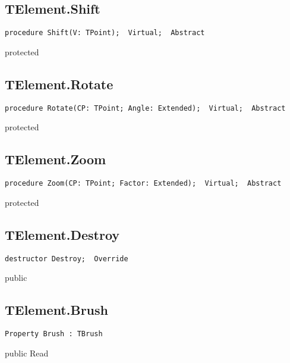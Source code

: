 \subsection{TElement.Shift}
\label{hmi:drawncontrol:telement:shift}
\begin{FPCList}
\Declaration 

\begin{verbatim}
procedure Shift(V: TPoint);  Virtual;  Abstract
\end{verbatim}
\Visibility
protected
\end{FPCList}
\subsection{TElement.Rotate}
\label{hmi:drawncontrol:telement:rotate}
\begin{FPCList}
\Declaration 

\begin{verbatim}
procedure Rotate(CP: TPoint; Angle: Extended);  Virtual;  Abstract
\end{verbatim}
\Visibility
protected
\end{FPCList}
\subsection{TElement.Zoom}
\label{hmi:drawncontrol:telement:zoom}
\begin{FPCList}
\Declaration 

\begin{verbatim}
procedure Zoom(CP: TPoint; Factor: Extended);  Virtual;  Abstract
\end{verbatim}
\Visibility
protected
\end{FPCList}
\subsection{TElement.Destroy}
\label{hmi:drawncontrol:telement:destroy}
\begin{FPCList}
\Declaration 

\begin{verbatim}
destructor Destroy;  Override
\end{verbatim}
\Visibility
public
\end{FPCList}
\subsection{TElement.Brush}
\label{hmi:drawncontrol:telement:brush}
\begin{FPCList}
\Declaration 

\begin{verbatim}
Property Brush : TBrush
\end{verbatim}
\Visibility
public
\Access
Read
\end{FPCList}
